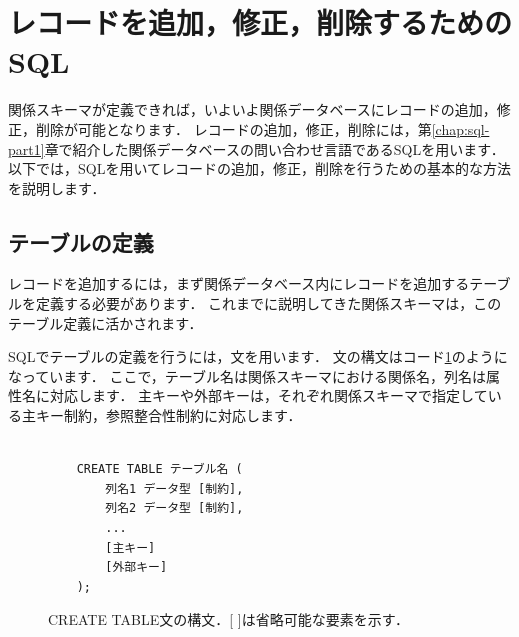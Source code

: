 \section{レコードを追加，修正，削除するためのSQL}
関係スキーマが定義できれば，いよいよ関係データベースにレコードの追加，修正，削除が可能となります．
レコードの追加，修正，削除には，第\ref{chap:sql-part1}章で紹介した関係データベースの問い合わせ言語であるSQLを用います．
以下では，SQLを用いてレコードの追加，修正，削除を行うための基本的な方法を説明します．

\subsection{テーブルの定義}
レコードを追加するには，まず関係データベース内にレコードを追加するテーブルを定義する必要があります．
これまでに説明してきた関係スキーマは，このテーブル定義に活かされます．

SQLでテーブルの定義を行うには，文を用います．
文の構文はコード\ref{code:create-table-structure}のようになっています．
ここで，テーブル名は関係スキーマにおける関係名，列名は属性名に対応します．
主キーや外部キーは，それぞれ関係スキーマで指定している主キー制約，参照整合性制約に対応します．
\begin{figure}[!htbp]
    \begin{verbatim}

    CREATE TABLE テーブル名 (
        列名1 データ型 [制約],
        列名2 データ型 [制約],
        ...
        [主キー]
        [外部キー]
    );
    \end{verbatim}
    \captionsetup{name=コード}
    \caption{CREATE TABLE文の構文．[ ]は省略可能な要素を示す．}
    \label{code:create-table-structure}
\end{figure}

